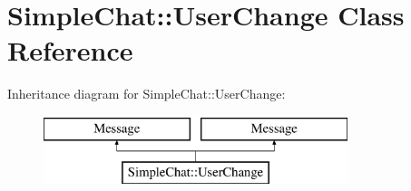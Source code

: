 \hypertarget{classSimpleChat_1_1UserChange}{\section{Simple\-Chat\-:\-:User\-Change Class Reference}
\label{classSimpleChat_1_1UserChange}
}
Inheritance diagram for Simple\-Chat\-:\-:User\-Change\-:\begin{figure}[H]
\begin{center}
\leavevmode
\includegraphics[height=2.000000cm]{classSimpleChat_1_1UserChange}
\end{center}
\end{figure}
